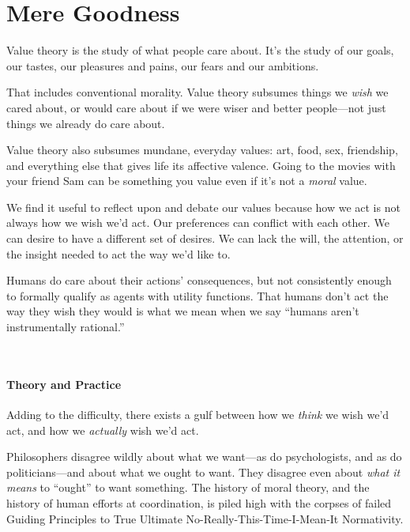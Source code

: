 \part{Mere Goodness}




{
 Value theory is the study of what people care about.
It's the study of our goals, our tastes, our pleasures
and pains, our fears and our ambitions.}

{
 That includes conventional morality. Value theory subsumes things
we \textit{wish} we cared about, or would care about if we were wiser
and better people---not just things we already do care about.}

{
 Value theory also subsumes mundane, everyday values: art, food,
sex, friendship, and everything else that gives life its affective
valence. Going to the movies with your friend Sam can be something you
value even if it's not a \textit{moral} value.}

{
 We find it useful to reflect upon and debate our values because
how we act is not always how we wish we'd act. Our
preferences can conflict with each other. We can desire to have a
different set of desires. We can lack the will, the attention, or the
insight needed to act the way we'd like to.}

{
 Humans do care about their actions' consequences,
but not consistently enough to formally qualify as agents with utility
functions. That humans don't act the way they wish they
would is what we mean when we say ``humans
aren't instrumentally rational.''}

{
 ~}

\subsection{Theory and Practice}

{
 Adding to the difficulty, there exists a gulf between how we
\textit{think} we wish we'd act, and how we
\textit{actually} wish we'd act.}

{
 Philosophers disagree wildly about what we want---as do
psychologists, and as do politicians---and about what we ought to want.
They disagree even about \textit{what it means} to
``ought'' to want something. The
history of moral theory, and the history of human efforts at
coordination, is piled high with the corpses of failed Guiding
Principles to True Ultimate No-Really-This-Time-I-Mean-It Normativity.}

